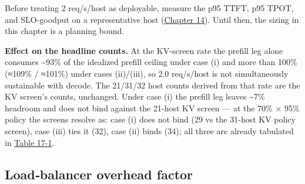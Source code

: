 Before treating 2 req/s/host as deployable, measure the p95 TTFT, p95
TPOT, and SLO-goodput on a representative host (\hyperref[chap:14]{Chapter 14}). Until then,
the sizing in this chapter is a planning bound.

\textbf{Effect on the headline counts.} At the KV-screen rate the
prefill leg alone consumes \textasciitilde93\% of the idealized prefill
ceiling under case (i) and more than 100\% (≈109\% / ≈101\%) under cases
(ii)/(iii), so 2.0 req/s/host is not simultaneously sustainable with
decode. The 21/31/32 host counts derived from that rate are the KV
screen's counts, unchanged. Under case (i) the prefill leg leaves
\textasciitilde7\% headroom and does not bind against the 21-host KV
screen --- at the 70\% × 95\% policy the screens resolve as: case (i)
does not bind (29 vs the 31-host KV policy screen), case (iii) ties it
(32), case (ii) binds (34); all three are already tabulated in \hyperref[tab:17.1]{Table 17-1}.

\subsection{Load‑balancer overhead
factor}\label{loadbalancer-overhead-factor}

